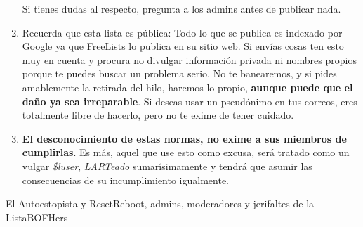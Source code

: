 \documentclass[]{article}
\begin{document}
\begin{enumerate}
  Si tienes dudas al respecto, pregunta a los admins antes de publicar
  nada.
\item
  Recuerda que esta lista es pública: Todo lo que se publica es indexado
  por Google ya que
  \href{"http://www.freelists.org/archive/bofhers/"}{FreeLists lo
  publica en su sitio web}. Si envías cosas ten esto muy en cuenta y
  procura no divulgar información privada ni nombres propios porque te
  puedes buscar un problema serio. No te banearemos, y si pides
  amablemente la retirada del hilo, haremos lo propio, \textbf{aunque
  puede que el daño ya sea irreparable}. Si deseas usar un pseudónimo en
  tus correos, eres totalmente libre de hacerlo, pero no te exime de
  tener cuidado.
\item
  \textbf{El desconocimiento de estas normas, no exime a sus miembros de
  cumplirlas}. Es más, aquel que use esto como excusa, será tratado como
  un vulgar \emph{\$luser}, \emph{LARTeado} sumarísimamente y tendrá que
  asumir las consecuencias de su incumplimiento igualmente.
\end{enumerate}

El Autoestopista y ResetReboot, admins, moderadores y jerifaltes de la
ListaBOFHers
\end{document}
